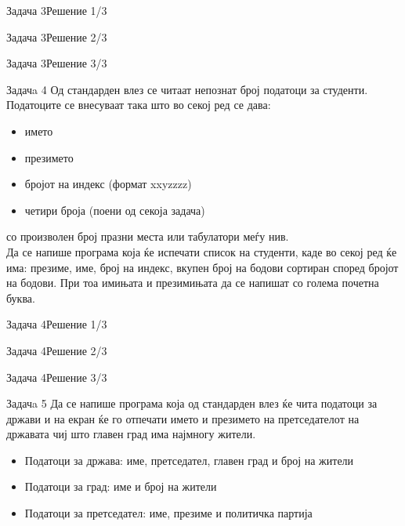 \begin{frame}[fragile]{Задача 3}{Решение 1/3}

\end{frame}

\begin{frame}[fragile]{Задача 3}{Решение 2/3}

\end{frame}

\begin{frame}[fragile]{Задача 3}{Решение 3/3}

\end{frame}

\begin{frame}{Задачa 4}
Од стандарден влез се читаат непознат број податоци за студенти. Податоците се
внесуваат така што во секој ред се дава:
\begin{itemize}
  \item името
  \item презимето
  \item бројот на индекс (формат xxyzzzz)
  \item четири броја (поени од секоја задача)
\end{itemize}         
     со произволен број празни места или табулатори меѓу нив.\\
Да се напише програма која ќе испечати список на студенти, каде во секој ред ќе
има: презиме, име, број на индекс, вкупен број на бодови сортиран според бројот
на бодови. При тоа имињата и презимињата да се напишат со голема почетна буква.
\end{frame}

\begin{frame}[fragile]{Задача 4}{Решение 1/3}

\end{frame}

\begin{frame}[fragile]{Задача 4}{Решение 2/3}

\end{frame}

\begin{frame}[fragile]{Задача 4}{Решение 3/3}

\end{frame}


\begin{frame}{Задачa 5}
Да се напише програма која од стандарден влез ќе чита податоци за држави и на
екран ќе го отпечати името и презимето на претседателот на државата чиј што главен град
има најмногу жители.
\begin{itemize}
  \item Податоци за држава: име, претседател, главен град и број на жители
  \item Податоци за град: име и број на жители
  \item Податоци за претседател: име, презиме и политичка партија
\end{itemize}
\end{frame}


